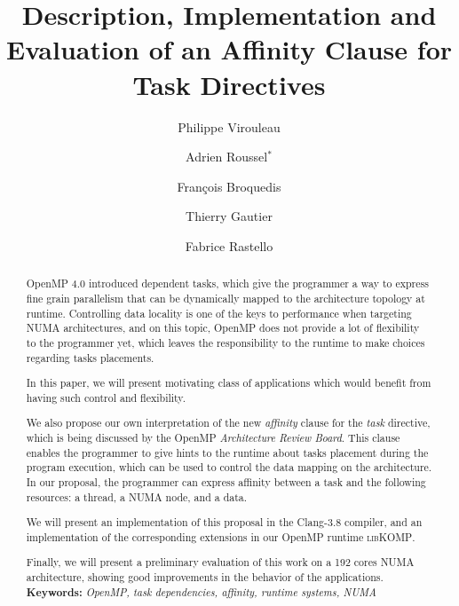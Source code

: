 \documentclass{Styles/llncs}
\newcommand{\libXKOMP}{\textsc{libKOMP}\xspace}
\begin{document}
\title{Description, Implementation and Evaluation of an Affinity Clause for Task Directives}
\author{
  Philippe Virouleau \and Adrien Roussel$^{*}$ \and François Broquedis \and Thierry Gautier \and Fabrice Rastello
 \vspace*{-1ex}}
\date{}
\maketitle

\begin{abstract}
  \vspace*{-5ex}
OpenMP 4.0 introduced dependent tasks, which give the programmer a way to
express fine grain parallelism that can be dynamically mapped to the architecture
topology at runtime.
Controlling data locality is one of the keys to performance when targeting NUMA architectures,
and on this topic, OpenMP does not provide a lot of flexibility to the programmer yet,
which leaves the responsibility to the runtime to make choices regarding tasks
placements.

In this paper, we will present motivating class of applications which would benefit
from having such control and flexibility.

We also propose our own interpretation of the new \emph{affinity} clause for the \emph{task} directive,
which is being discussed by the OpenMP \emph{Architecture Review Board}.
This clause enables the programmer to give hints to the runtime about
tasks placement during the program execution, which can be used to control the data
mapping on the architecture. In our proposal, the programmer can express affinity between a task and
the following resources: a thread, a NUMA node, and a data.

We will present an implementation of this proposal in the Clang-3.8 compiler,
and an implementation of the corresponding extensions in our OpenMP runtime \libXKOMP.

Finally, we will present a preliminary evaluation of this work on a 192 cores NUMA architecture,
showing good improvements in the behavior of the applications.
\smallskip
  \noindent\textbf{Keywords:}
  \emph{
    OpenMP, task dependencies, affinity, runtime systems, NUMA
  }
\end{abstract}
\end{document}

